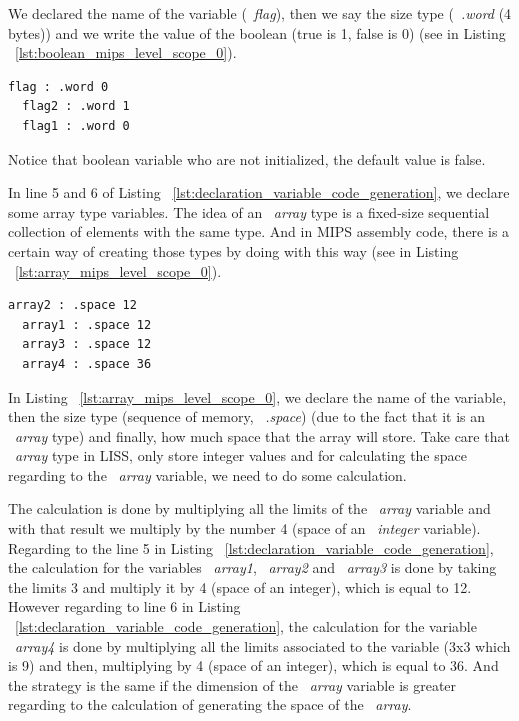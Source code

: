 \documentclass[
  oneside,
  11pt, a4paper,
  footinclude=true,
  headinclude=true,
  cleardoublepage=empty
]{scrbook}
\begin{document}
We declared the name of the variable (~\textit{flag}), then we say the size type (~\textit{.word} (4 bytes)) and we write the value of the boolean (true is 1, false is 0) (see in Listing ~\ref{lst:boolean_mips_level_scope_0}).

\begin{lstlisting}[caption={Code generation of boolean variables in MIPS assembly code},label={lst:boolean_mips_level_scope_0}]
  flag : .word 0		
  flag2 : .word 1		
  flag1 : .word 0		
\end{lstlisting}

Notice that boolean variable who are not initialized, the default value is false.

In line 5 and 6 of Listing ~\ref{lst:declaration_variable_code_generation}, we declare some array type variables.
The idea of an ~\textit{array} type is a fixed-size sequential collection of elements with the same type. 
And in MIPS assembly code, there is a certain way of creating those types by doing with this way (see in Listing ~\ref{lst:array_mips_level_scope_0}).

\begin{lstlisting}[caption={Code generation of array variables in MIPS assembly code},label={lst:array_mips_level_scope_0}]
  array2 : .space 12		
  array1 : .space 12		
  array3 : .space 12		
  array4 : .space 36		
\end{lstlisting}

In Listing ~\ref{lst:array_mips_level_scope_0}, we declare the name of the variable, then the size type (sequence of memory, ~\textit{.space}) (due to the fact that it is an ~\textit{array} type) and finally, how much space that the array will store.
Take care that ~\textit{array} type in LISS, only store integer values and for calculating the space regarding to the ~\textit{array} variable, we need to do some calculation. 

The calculation is done by multiplying all the limits of the ~\textit{array} variable and with that result we multiply by the number 4 (space of an ~\textit{integer} variable).
Regarding to the line 5 in Listing ~\ref{lst:declaration_variable_code_generation}, the calculation for the variables ~\textit{array1}, ~\textit{array2} and ~\textit{array3} is done by taking the limits 3 and multiply it by 4 (space of an integer), which is equal to 12.
However regarding to line 6 in Listing ~\ref{lst:declaration_variable_code_generation}, the calculation for the variable ~\textit{array4} is done by multiplying all the limits associated to the variable (3x3 which is 9) and then, multiplying by 4 (space of an integer), which is equal to 36. And the strategy is the same if the dimension of the ~\textit{array} variable is greater regarding to the calculation of generating the space of the ~\textit{array}.
\end{document}
